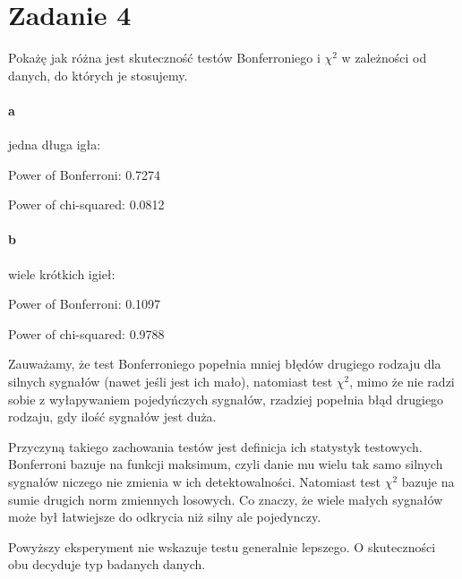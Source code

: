 \documentclass[a4paper,11pt]{article}
\begin{document}
\section{Zadanie 4}

Pokażę jak różna jest skuteczność testów Bonferroniego i $\chi^{2}$ w zależności od danych, do których je stosujemy. 

\paragraph{a} jedna długa igła:

Power of Bonferroni: 0.7274 

Power of chi-squared: 0.0812 

\paragraph{b} wiele krótkich igieł:

Power of Bonferroni: 0.1097 

Power of chi-squared: 0.9788

Zauważamy, że test Bonferroniego popełnia mniej błędów drugiego rodzaju dla silnych sygnałów (nawet  jeśli jest ich mało), natomiast test $\chi^{2}$, mimo że nie radzi sobie z wyłapywaniem pojedyńczych sygnałów, rzadziej popełnia błąd drugiego rodzaju, gdy ilość sygnałów jest duża. 

Przyczyną takiego zachowania testów jest definicja ich statystyk testowych. Bonferroni bazuje na funkcji maksimum, czyli danie mu wielu tak samo silnych sygnałów niczego nie zmienia w ich detektowalności. Natomiast test $\chi^{2}$ bazuje na sumie drugich norm zmiennych losowych. Co znaczy, że wiele małych sygnałów może był łatwiejsze do odkrycia niż silny ale pojedynczy. 

Powyższy eksperyment nie wskazuje testu generalnie lepszego. O skuteczności obu decyduje typ badanych danych. 
\end{document}
